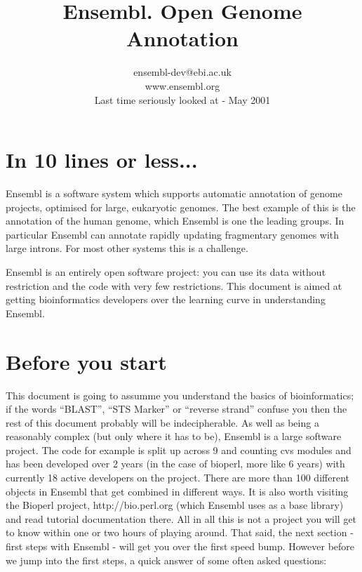 \documentclass[11pt,a4paper]{article}
\begin{document}
\title{Ensembl. Open Genome Annotation}
\author{ensembl-dev@ebi.ac.uk\\www.ensembl.org\\Last time seriously looked at - May 2001}


\maketitle

\newpage
\tableofcontents
\newpage

 
\newpage

\section{In 10 lines or less...}

Ensembl is a software system which supports automatic annotation of
genome projects, optimised for large, eukaryotic genomes. The best
example of this is the annotation of the human genome, which Ensembl
is one the leading groups. In particular Ensembl can annotate rapidly
updating fragmentary genomes with large introns. For most other systems
this is a challenge.

Ensembl is an entirely open software project: you can use its data
without restriction and the code with very few restrictions. This
document is aimed at getting bioinformatics developers over the
learning curve in understanding Ensembl.

\section{Before you start}

This document is going to assumme you understand the basics of
bioinformatics; if the words ``BLAST'', ``STS Marker'' or ``reverse
strand'' confuse you then the rest of this document probably will be
indecipherable. As well as being a reasonably complex (but only where
it has to be), Ensembl is a large software project. The code for
example is split up across 9 and counting cvs modules and has been
developed over 2 years (in the case of bioperl, more like 6 years)
with currently 18 active developers on the project. There are more
than 100 different objects in Ensembl that get combined in different
ways.  It is also worth visiting the Bioperl project,
http://bio.perl.org (which Ensembl uses as a base library) and read
tutorial documentation there. All in all this is not a project you
will get to know within one or two hours of playing around. That said,
the next section - first steps with Ensembl - will get you over the
first speed bump. However before we jump into the first steps, a quick
answer of some often asked questions:
\end{document}
